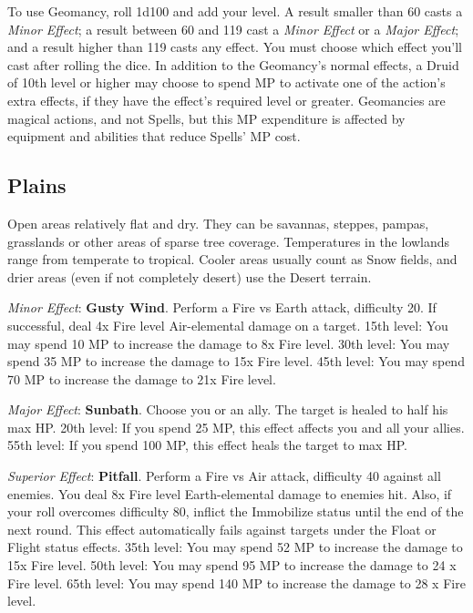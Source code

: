 \label{sec:magic-geo}
To use Geomancy, roll 1d100 and add your level. A result smaller than 60 casts a \textit{Minor Effect}; a result between 60 and 119 cast a \textit{Minor Effect} or a \textit{Major Effect}; and a result higher than 119 casts any effect.  You must choose which effect you'll cast after rolling the dice. In addition to the Geomancy’s normal  effects, a Druid of 10th level or higher may choose to spend MP to activate one of the action’s extra effects,  if they have the effect’s required level or greater. Geomancies are magical actions, and not Spells, but this  MP expenditure is affected by equipment and abilities that reduce Spells’ MP cost.

\begin{multicols}{2}
\subsection{Plains}
\label{subsec:geo-plains}
	
Open areas relatively flat and dry. They can be savannas, steppes, pampas, grasslands or other areas of sparse tree coverage. Temperatures in the  lowlands range from temperate to tropical. Cooler  areas usually count as Snow fields, and drier areas  (even if not completely desert) use the Desert  terrain.

\textit{Minor Effect}: \textbf{Gusty Wind}. Perform a Fire vs Earth attack, difficulty 20. If successful, deal 4x Fire level Air-elemental damage on a target. 15th level: You may spend 10 MP to increase the damage to 8x Fire level. 30th level: You may spend 35 MP to increase the damage to 15x Fire level. 45th level: You may spend 70 MP to increase the damage to 21x Fire level.

\textit{Major Effect}: \textbf{Sunbath}. Choose you or an ally. The target is healed to half his max HP. 20th level: If you spend 25 MP, this effect affects you and all your allies. 55th level: If you spend 100 MP, this effect heals the target to max HP.

\textit{Superior Effect}: \textbf{Pitfall}. Perform a Fire vs Air attack, difficulty 40 against all enemies. You deal 8x Fire level Earth-elemental damage to enemies hit. Also, if your roll overcomes difficulty 80, inflict the Immobilize status until the end of the next round. This effect automatically fails against targets under the Float or Flight status effects. 35th level: You may spend 52 MP to increase the damage to 15x Fire level. 50th level: You may spend 95 MP to increase the damage to 24 x Fire level. 65th level: You may spend 140 MP to increase the damage to 28 x Fire level.


\end{multicols}
